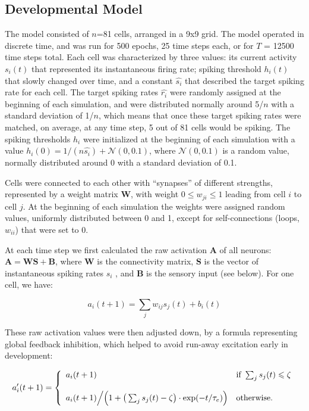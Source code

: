 \documentclass{article}
\begin{document}
\subsection*{Developmental Model}

The model consisted of $n$=81 cells, arranged in a 9x9 grid. The model operated in discrete time, and was run for 500 epochs, 25 time steps each, or for $T$ = 12500 time steps total. Each cell was characterized by three values: its current activity $s_i(t)$ that represented its instantaneous firing rate; spiking threshold $h_i(t)$ that slowly changed over time, and a constant $\hat{s_i}$ that described the target spiking rate for each cell. The target spiking rates $\hat{r_i}$ were randomly assigned at the beginning of each simulation, and were distributed normally around 5/$n$ with a standard deviation of 1/$n$, which means that once these target spiking rates were matched, on average, at any time step, 5 out of 81 cells would be spiking. The spiking thresholds $h_i$ were initialized at the beginning of each simulation with a value $h_i(0) = 1/(n \hat{s_i}) + \mathcal{N}(0,0.1)$, where $\mathcal{N}(0,0.1)$ is a random value, normally distributed around 0 with a standard deviation of 0.1.

Cells were connected to each other with “synapses” of different strengths, represented by a weight matrix \textbf{W}, with weight $0 \leqslant w_{ji} \leqslant 1$ leading from cell $i$ to cell $j$. At the beginning of each simulation the weights were assigned random values, uniformly distributed between 0 and 1, except for self-connections (loops, $w_{ii}$) that were set to 0.

At each time step we first calculated the raw activation \textbf{A} of all neurons: $\textbf{A} = \textbf{WS} + \textbf{B}$, where \textbf{W} is the connectivity matrix, \textbf{S} is the vector of instantaneous spiking rates $s_i$ , and \textbf{B} is the sensory input (see below). For one cell, we have:

\[ a_i(t+1) = \sum_j{w_{ij}s_j(t)} + b_i(t) \]

These raw activation values were then adjusted down, by a formula representing global feedback inhibition, which helped to avoid run-away excitation early in development:

\[ a'_i(t+1) = \left \{ \begin{array}{l l} a_i(t+1)
& \text{if } \sum_j{s_j(t)} \leqslant \zeta \\ 
 & \\
a_i(t+1)\Big/ \Big(1 + \big(\sum_j{s_j(t)} - \zeta\big) \cdot \exp(- t/\tau_e)\Big) 
& \text{otherwise.} \end{array} \right. \]
\end{document}
